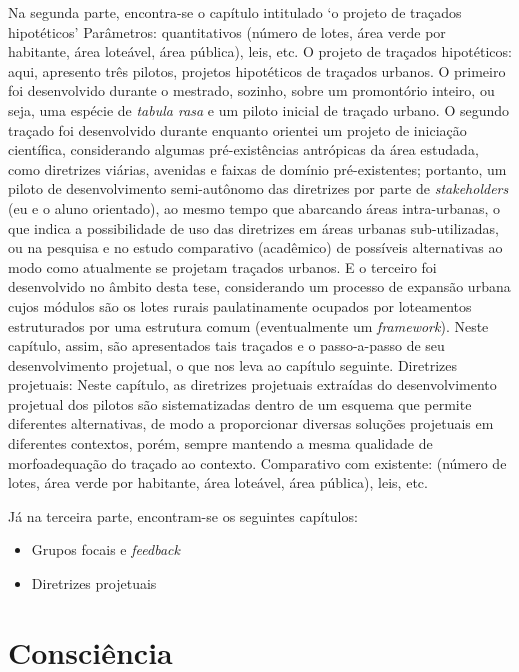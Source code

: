 \documentclass[12pt, a4paper]{book} %
\begin{document}
            Na segunda parte, encontra-se o capítulo intitulado `o projeto de traçados hipotéticos'
                Parâmetros: quantitativos (número de lotes, área verde por habitante, área loteável, área pública), leis, etc.
                O projeto de traçados hipotéticos: aqui, apresento três pilotos, projetos hipotéticos de traçados urbanos. O primeiro foi desenvolvido durante o mestrado, sozinho, sobre um promontório inteiro, ou seja, uma espécie de \textit{tabula rasa} e um piloto inicial de traçado urbano. O segundo traçado foi desenvolvido durante enquanto orientei um projeto de iniciação científica, considerando algumas pré-existências antrópicas da área estudada, como diretrizes viárias, avenidas e faixas de domínio pré-existentes; portanto, um piloto de desenvolvimento semi-autônomo das diretrizes por parte de \textit{stakeholders} (eu e o aluno orientado), ao mesmo tempo que abarcando áreas intra-urbanas, o que indica a possibilidade de uso das diretrizes em áreas urbanas sub-utilizadas, ou na pesquisa e no estudo comparativo (acadêmico) de possíveis alternativas ao modo como atualmente se projetam traçados urbanos. E o terceiro foi desenvolvido no âmbito desta tese, considerando um processo de expansão urbana cujos módulos são os lotes rurais paulatinamente ocupados por loteamentos estruturados por uma estrutura comum (eventualmente um \textit{framework}). Neste capítulo, assim, são apresentados tais traçados e o passo-a-passo de seu desenvolvimento projetual, o que nos leva ao capítulo seguinte.
                Diretrizes projetuais: Neste capítulo, as diretrizes projetuais extraídas do desenvolvimento projetual dos pilotos são sistematizadas dentro de um esquema que permite diferentes alternativas, de modo a proporcionar diversas soluções projetuais em diferentes contextos, porém, sempre mantendo a mesma qualidade de morfoadequação do traçado ao contexto.
                Comparativo com existente: (número de lotes, área verde por habitante, área loteável, área pública), leis, etc.
                
            Já na terceira parte, encontram-se os seguintes capítulos:
            \begin{itemize}
                \item Grupos focais e \textit{feedback}
                \item Diretrizes projetuais
            \end{itemize}


    
    \part[Consciência]{Consciência}
\end{document}
